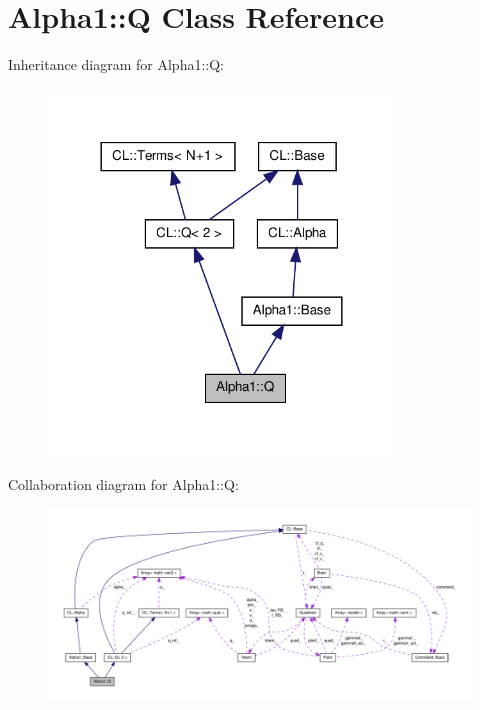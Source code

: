 \hypertarget{classAlpha1_1_1Q}{\section{\-Alpha1\-:\-:\-Q \-Class \-Reference}
\label{classAlpha1_1_1Q}
}


\-Inheritance diagram for \-Alpha1\-:\-:\-Q\-:\nopagebreak
\begin{figure}[H]
\begin{center}
\leavevmode
\includegraphics[width=260pt]{classAlpha1_1_1Q__inherit__graph}
\end{center}
\end{figure}


\-Collaboration diagram for \-Alpha1\-:\-:\-Q\-:\nopagebreak
\begin{figure}[H]
\begin{center}
\leavevmode
\includegraphics[width=350pt]{classAlpha1_1_1Q__coll__graph}
\end{center}
\end{figure}
